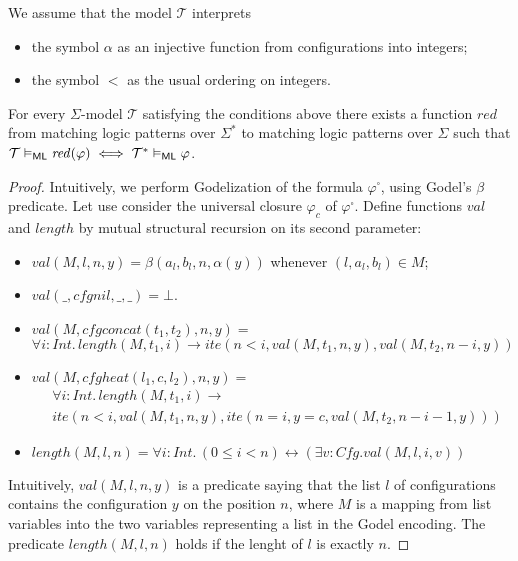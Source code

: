 We assume that the model $\mathcal{T}$ interprets
\begin{itemize}
    \item the symbol $\alpha$ as an injective function from configurations into integers;
    \item the symbol $<$ as the usual ordering on integers.
\end{itemize}
\begin{theorem}\label{thm:oracleLifting}
For every $\Sigma$-model $\mathcal{T}$
satisfying the conditions above
there exists a function $\mathit{red}$ from matching logic patterns over $\Sigma^*$
to matching logic patterns over $\Sigma$ such that
$\mathcal{T} \vDash_{\mathsf{ML}} \mathit{red}(\varphi) \iff \mathcal{T^*} \vDash_{\mathsf{ML}} \varphi$.
\end{theorem}
\begin{proof}
Intuitively, we perform Godelization of the formula $\varphi^\square$, using Godel's $\beta$ predicate.
Let use consider the universal closure $\varphi_c$ of $\varphi^\square$.
Define functions $\mathit{val}$ and $\mathit{length}$ by mutual structural recursion on its second parameter:
\begin{itemize}
    \item $\mathit{val}(M, l, n, y) = \beta(a_{l}, b_{l}, n, \alpha(y))$ whenever $(l, a_{l}, b_{l}) \in M$;
    \item $\mathit{val}(\_, \mathit{cfgnil}, \_, \_) = \bot$.
    \item $\mathit{val}(M, \mathit{cfgconcat}(t_1, t_2), n, y) =$ \\
    $\forall i:\mathit{Int}. \, \mathit{length}(M, t_1, i) \rightarrow \mathit{ite}(n < i, \mathit{val}(M, t_1, n, y), \mathit{val}(M, t_2, n-i, y))$
    \item $\mathit{val}(M, \mathit{cfgheat}(l_1, c, l_2), n, y) =$
    \begin{align*}
        & \forall i:\mathit{Int}. \, \mathit{length}(M, t_1, i) \rightarrow \\
        & \mathit{ite}(n < i, \mathit{val}(M, t_1, n, y), \mathit{ite}(n = i, y = c, \mathit{val}(M, t_2, n-i-1, y)))
    \end{align*}    
    \item $\mathit{length}(M, l, n) = \forall i:\mathit{Int}.\, (0 \leq i < n) \leftrightarrow (\exists v : \mathit{Cfg}. \mathit{val}(M, l, i, v))$
\end{itemize}
Intuitively, $\mathit{val}(M, l, n, y)$ is a predicate saying that the list $l$ of configurations
contains the configuration $y$ on the position $n$,
where $M$ is a mapping from list variables into the two variables representing a list in the Godel encoding.
The predicate $\mathit{length}(M, l, n)$ holds if the lenght of $l$ is exactly $n$.



\end{proof}
